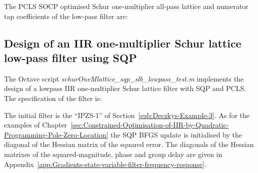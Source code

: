 \documentclass[a4paper,twoside,10pt,english]{report}
\begin{document}
The PCLS SOCP optimised Schur one-multiplier all-pass lattice and numerator tap 
coefficients of the low-pass filter are:
\begin{small}




\end{small}
\clearpage
\subsection{\label{sec:Design-IIR-one-multiplier-Schur-lattice-low-pass-SQP}Design of an IIR one-multiplier Schur lattice low-pass filter using SQP}
The Octave script \emph{schurOneMlattice\_sqp\_slb\_lowpass\_test.m} implements
the design of a lowpass IIR one-multiplier Schur lattice filter with SQP and 
PCLS. The specification of the filter is:
\begin{small}

\end{small}
The initial filter is the ``IPZS-1'' of Section~\ref{sub:Deczkys-Example-3}. As
for the examples of 
Chapter~\ref{sec:Constrained-Optimisation-of-IIR-by-Quadratic-Programming-Pole-Zero-Location}
the SQP BFGS update is initialised by the diagonal of the Hessian matrix of the
squared error. The diagonals of the Hessian matrixes of the 
squared-magnitude, phase and group delay are given in 
Appendix~\ref{app:Gradients-state-variable-filter-frequency-response}.
\end{document}
